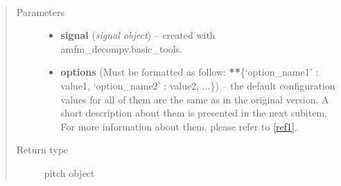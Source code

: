 \documentclass[letterpaper,10pt,english]{sphinxmanual}
\begin{document}
\begin{fulllineitems}
\label{pYAAPT:amfm_decompy.pYAAPT.yaapt}~\begin{quote}\begin{description}
\item[{Parameters}] \leavevmode\begin{itemize}
\item {} 
\textbf{signal} (\emph{signal object}) -- created with amfm\_decompy.basic\_tools.

\item {} 
\textbf{options} (Must be formatted as follow: {\color{red}\bfseries{}**}\{`option\_name1' : value1,   `option\_name2' : value2, ...\}) -- the default configuration values for all of them are the same as in the original version. A short description about them is presented in the next subitem. For more information about them, please refer to {\hyperref[pYAAPT:ref1]{{[}ref1{]}}}.

\end{itemize}

\item[{Return type}] \leavevmode
pitch object

\end{description}\end{quote}

\end{fulllineitems}
\end{document}
